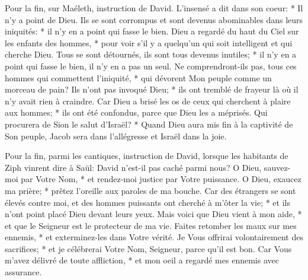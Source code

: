 Pour la fin, sur Maéleth, instruction de David. L'insensé a dit dans son coeur: * Il n'y a point de Dieu.
Ils se sont corrompus et sont devenus abominables dans leurs iniquités: * il n'y en a point qui fasse le bien.
Dieu a regardé du haut du Ciel sur les enfants des hommes, * pour voir s'il y a quelqu'un qui soit intelligent et qui cherche Dieu.
Tous se sont détournés, ils sont tous devenus inutiles; * il n'y en a point qui fasse le bien, il n'y en a pas un seul.
Ne comprendront-ils pas, tous ces hommes qui commettent l'iniquité, * qui dévorent Mon peuple comme un morceau de pain?
Ils n'ont pas invoqué Dieu; * ils ont tremblé de frayeur là où il n'y avait rien à craindre. Car Dieu a brisé les os de ceux qui cherchent à plaire aux hommes; * ils ont été confondus, parce que Dieu les a méprisés.
Qui procurera de Sion le salut d'Israël? * Quand Dieu aura mis fin à la captivité de Son peuple, Jacob sera dans l'allégresse et Israël dans la joie.

Pour la fin, parmi les cantiques, instruction de David,
lorsque les habitants de Ziph vinrent dire à Saül: David n'est-il pas caché parmi nous?
O Dieu, sauvez-moi par Votre Nom, * et rendez-moi justice par Votre puissance.
O Dieu, exaucez ma prière; * prêtez l'oreille aux paroles de ma bouche.
Car des étrangers se sont élevés contre moi, et des hommes puissants ont cherché à m'ôter la vie; * et ils n'ont point placé Dieu devant leurs yeux.
Mais voici que Dieu vient à mon aide, * et que le Seigneur est le protecteur de ma vie.
Faites retomber les maux sur mes ennemis, * et exterminez-les dans Votre vérité.
Je Vous offrirai volontairement des sacrifices; * et je célébrerai Votre Nom, Seigneur, parce qu'il est bon.
Car Vous m'avez délivré de toute affliction, * et mon oeil a regardé mes ennemis avec assurance.


